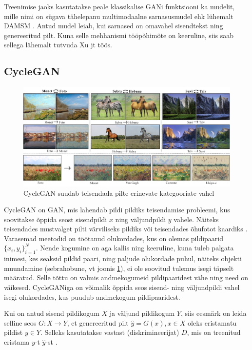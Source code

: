 \documentclass{vilgym}
\begin{document}
	Treenimise jaoks kasutatakse peale klassikalise GANi funktsiooni ka mudelit, mille nimi on sügava tähelepanu multimodaalne sarnasusmudel ehk lühemalt DAMSM . Antud mudel leiab, kui sarnased on omavahel sisendtekst ning genereeritud pilt. Kuna selle mehhanismi tööpõhimõte on keeruline, siis saab sellega lähemalt tutvuda Xu jt töös. \parencite{attngan}

	\subsection{CycleGAN}
	\begin{figure}[t]
		\centering
			\includegraphics[width=\linewidth]{images/cyclegan_est.png}
			\caption{CycleGAN suudab teisendada pilte erinevate kategooriate vahel \parencite{cyclegan}}
			\label{fig:cyclegan}
	\end{figure}

	CycleGAN on GAN, mis lahendab pildi pildiks teisendamise probleemi, kus soovitakse õppida seost sisendpildi $ x $ ning väljundpildi $ y $ vahele. Näiteks teisendades mustvalget pilti värviliseks pildiks või teisendades õhufotot kaardiks . Varasemad meetodid on töötanud olukordades, kus on olemas pildipaarid $ \{x_i, y_i\}_{i=1}^N $. Nende kogumine on aga kallis ning keeruline, kuna tuleb palgata inimesi, kes seaksid pildid paari, ning paljude olukordade puhul, näiteks objekti muundamine (sebra\textrightarrow hobune, vt joonis \ref{fig:cyclegan}), ei ole soovitud tulemus isegi täpselt määratud. Selle tõttu on valmis andmekogumeid pildipaaridest vähe ning need on väikesed. CycleGANiga on võimalik õppida seos sisend- ning väljundpildi vahel isegi olukordades, kus puudub andmekogum pildipaaridest. 

	Kui on antud sisend pildikogum $ X $ ja väljund pildikogum $ Y $, siis eesmärk on leida selline seos $ G: X \rightarrow Y $, et genereeritud pilt $ \hat{y} = G(x), x \in X $ oleks eristamatu pildist $ y \in Y $. Selleks kasutatakse vastast (diskrimineerijat) $ D $, mis on treenitud eristama $ y $-t $ \hat{y} $-st . 
\end{document}

